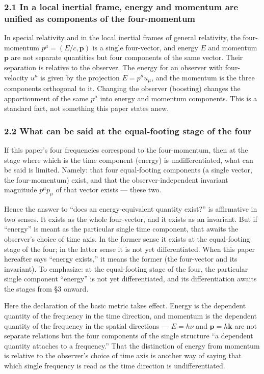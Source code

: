 \documentclass[
]{article}
\begin{document}
\subsubsection{2.1 In a local inertial frame, energy and momentum are
unified as components of the
four-momentum}\label{in-a-local-inertial-frame-energy-and-momentum-are-unified-as-components-of-the-four-momentum}

In special relativity and in the local inertial frames of general
relativity, the four-momentum \(p^\mu=(E/c,\boldsymbol{p})\) is a single
four-vector, and energy \(E\) and momentum \(\boldsymbol{p}\) are not
separate quantities but four components of the same vector. Their
separation is relative to the observer. The energy for an observer with
four-velocity \(u^\mu\) is given by the projection \(E=p^\mu u_\mu\),
and the momentum is the three components orthogonal to it. Changing the
observer (boosting) changes the apportionment of the same \(p^\mu\) into
energy and momentum components. This is a standard fact, not something
this paper states anew.

\subsubsection{2.2 What can be said at the equal-footing stage of the
four}\label{what-can-be-said-at-the-equal-footing-stage-of-the-four}

If this paper's four frequencies correspond to the four-momentum, then
at the stage where which is the time component (energy) is
undifferentiated, what can be said is limited. Namely: that four
equal-footing components (a single vector, the four-momentum) exist, and
that the observer-independent invariant magnitude \(p^\mu p_\mu\) of
that vector exists --- these two.

Hence the answer to ``does an energy-equivalent quantity exist?'' is
affirmative in two senses. It exists as the whole four-vector, and it
exists as an invariant. But if ``energy'' is meant as the particular
single time component, that awaits the observer's choice of time axis.
In the former sense it exists at the equal-footing stage of the four; in
the latter sense it is not yet differentiated. When this paper hereafter
says ``energy exists,'' it means the former (the four-vector and its
invariant). To emphasize: at the equal-footing stage of the four, the
particular single component ``energy'' is not yet differentiated, and
its differentiation awaits the stages from §3 onward.

Here the declaration of the basic metric takes effect. Energy is the
dependent quantity of the frequency in the time direction, and momentum
is the dependent quantity of the frequency in the spatial directions ---
\(E=h\nu\) and \(\boldsymbol{p}=h\boldsymbol{k}\) are not separate
relations but the four components of the single structure ``a dependent
quantity attaches to a frequency.'' That the distinction of energy from
momentum is relative to the observer's choice of time axis is another
way of saying that which single frequency is read as the time direction
is undifferentiated.
\end{document}
